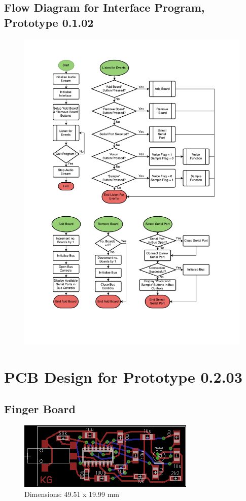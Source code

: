 \subsection{Flow Diagram for Interface Program, Prototype 0.1.02}
\label{pyblue_flow}
\begin{figure}[H]
\centering
\includegraphics[scale = 0.7]{Images/PyFlow}
\end{figure}

\newpage
\section{PCB Design for Prototype 0.2.03}

\subsection{Finger Board}
\label{fingerboardpcb}
\begin{figure}[H]
\centering
\includegraphics[scale = 2]{Images/mic_pcb_02}
\\ Dimensions: 49.51 x 19.99 mm
\end{figure}

